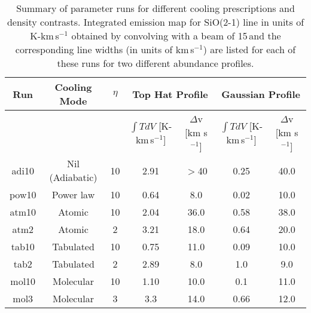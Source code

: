 \documentclass[useAMS,usenatbib]{mn2e}
\begin{document}
\begin{table*}
\centering 
\caption{Summary of parameter runs for different cooling prescriptions
  and density contrasts. Integrated
  emission map for SiO(2-1) line in units of K-km\,s$^{-1}$ obtained
  by convolving with a beam of 15\arcsec\,and the
  corresponding line widths (in units of km\,s$^{-1}$) are listed for each of these runs for two different abundance profiles.}
\begin{tabular}{c | c | c | c | c | c | c }
\hline
Run & Cooling Mode & $\eta$ & \multicolumn{2}{|c|}{Top Hat Profile} & \multicolumn{2}{|c|}{Gaussian Profile}\\
\hline\hline
&&& $\int T dV$ [K-km\,s$^{-1}$] & $\Delta$v [km s$^{-1}$] & $\int T dV$ [K-km\,s$^{-1}$] & $\Delta$v [km s$^{-1}$] \\
\hline
adi10 & Nil (Adiabatic) & 10 & 2.91 & $>$40 & 0.25 & 40.0 \\
pow10 & Power law & 10 & 0.64 & 8.0 & 0.02 & 10.0\\
atm10 & Atomic & 10 & 2.04 & 36.0 & 0.58 & 38.0 \\
atm2 & Atomic & 2 & 3.21 & 18.0 & 0.64 & 20.0 \\
tab10 & Tabulated & 10 & 0.75 & 11.0 & 0.09 & 10.0 \\
tab2 & Tabulated & 2 & 2.89 & 8.0 & 1.0 & 9.0 \\
mol10 & Molecular & 10 & 1.10 & 10.0 & 0.1 & 11.0 \\
mol3 & Molecular & 3 & 3.3 & 14.0 & 0.66 & 12.0\\
\hline
\end{tabular}
\label{tab:result1}
\end{table*}


 

\end{document}
